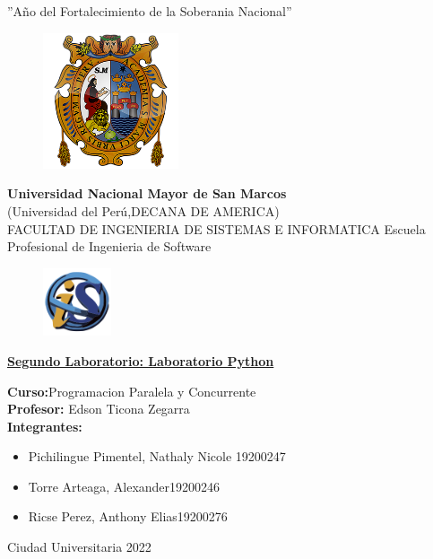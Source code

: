 \documentclass[12pt, letterpaper]{article}
\begin{document}
\begin{center}
    ''Año del Fortalecimiento de la Soberania Nacional''
    \vspace{5mm}
    \begin{figure}[h]
        \centering
        \includegraphics[width=4cm,height=4cm]{UNMSM}
    \end{figure}

    \textbf{Universidad Nacional Mayor de San Marcos} \\
    (Universidad del Perú,DECANA DE AMERICA)\\
    \vspace{5mm}
    FACULTAD DE INGENIERIA DE SISTEMAS E INFORMATICA
    Escuela Profesional de Ingenieria de Software
    \begin{figure}[h]
        \centering   
        \includegraphics[width=2cm,height=2cm]{FISI}   
    \end{figure}

\textbf{\underline{Segundo Laboratorio: Laboratorio Python}}

    \begin{flushleft}
    \textbf{Curso:}Programacion Paralela y Concurrente\\
    \vspace{2mm}
    \textbf{Profesor:} Edson Ticona Zegarra\\
    \vspace{2mm}
    \textbf{Integrantes:} 
    \begin{itemize}
        \item Pichilingue Pimentel, Nathaly Nicole\hspace{1cm} 19200247
        \item Torre Arteaga, Alexander\hspace{3.2cm}19200246
        \item Ricse Perez, Anthony Elias\hspace{3cm}19200276
    \end{itemize}
    \end{flushleft}

    Ciudad Universitaria 2022
 
\end{center}
\end{document}
